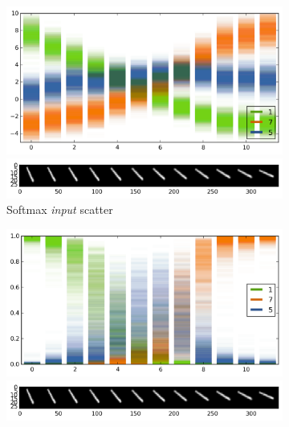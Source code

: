 \documentclass{article}
\theoremstyle{definition}
\begin{document}
\begin{figure}[t]
\vspace{-2mm}
	\centering
	\begin{subfigure}[b]{0.5\textwidth}
		\includegraphics[width=\linewidth, trim=0mm 0mm 0mm 0mm, clip]{figs/exp2/MC_dropout_mnist_ip3}
		
		\vspace{-3.5mm}
		\hspace{2.5mm}
		\includegraphics[width=0.955\linewidth, trim=7mm 7mm 0mm 4mm, clip]{figs/exp2/MC_dropout_mnist_x_axis}
		
		\caption{Softmax \textit{input} scatter} \label{fig:class_softmax_input}
	\end{subfigure}%
	\begin{subfigure}[b]{0.5\textwidth}
		\includegraphics[width=\linewidth, trim=0mm 0mm 0mm 0mm, clip]{figs/exp2/MC_dropout_mnist_prob}
		
		\vspace{-3.5mm}
		\hspace{2.5mm}
		\includegraphics[width=0.955\linewidth, trim=7mm 7mm 0mm 4mm, clip]{figs/exp2/MC_dropout_mnist_x_axis}
		

\end{subfigure}
\end{figure}
\end{document}
